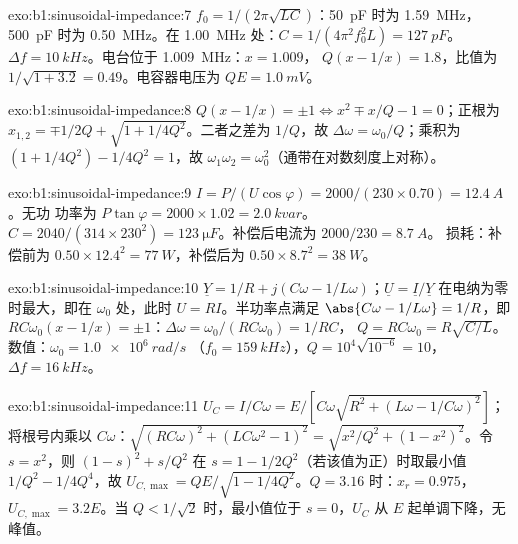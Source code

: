\begin{solution}{exo:b1:sinusoidal-impedance:7}
$f_0 = 1/(2\pi\sqrt{LC})$：\qty{50}{pF} 时为 \qty{1.59}{MHz}，\qty{500}{pF} 时为
\qty{0.50}{MHz}。在 \qty{1.00}{MHz} 处：$C = 1/(4\pi^2f_0^2L) = \qty{127}{pF}$。
$\Delta f = \qty{10}{kHz}$。电台位于 \qty{1.009}{MHz}：$x = 1.009$，
$Q(x - 1/x) = 1.8$，比值为 $1/\sqrt{1 + 3.2} = 0.49$。电容器电压为
$QE = \qty{1.0}{mV}$。
\end{solution}

\begin{solution}{exo:b1:sinusoidal-impedance:8}
$Q(x - 1/x) = \pm1 \Leftrightarrow x^2 \mp x/Q - 1 = 0$；正根为
$x_{1,2} = \mp 1/2Q + \sqrt{1 + 1/4Q^2}$。二者之差为 $1/Q$，故
$\Delta\omega = \omega_0/Q$；乘积为 $(1 + 1/4Q^2) - 1/4Q^2 = 1$，故
$\omega_1\omega_2 = \omega_0^2$（通带在对数刻度上对称）。
\end{solution}

\begin{solution}{exo:b1:sinusoidal-impedance:9}
$I = P/(U\cos\varphi) = 2000/(230 \times 0.70) = \qty{12.4}{A}$。无功
功率为 $P\tan\varphi = 2000 \times 1.02 = \qty{2.0}{kvar}$。$C = 2040/(314
\times 230^2) = \qty{123}{\micro F}$。补偿后电流为 $2000/230 = \qty{8.7}{A}$。
损耗：补偿前为 $0.50 \times 12.4^2 = \qty{77}{W}$，补偿后为 $0.50 \times 8.7^2 =
\qty{38}{W}$。
\end{solution}

\begin{solution}{exo:b1:sinusoidal-impedance:10}
$\underline Y = 1/R + j(C\omega - 1/L\omega)$；$\underline U = \underline I/
\underline Y$ 在电纳为零时最大，即在 $\omega_0$ 处，此时 $U = RI$。半功率点满足
$\abs{C\omega - 1/L\omega} = 1/R$，即
$RC\omega_0(x - 1/x) = \pm1$：$\Delta\omega = \omega_0/(RC\omega_0) = 1/RC$，
$Q = RC\omega_0 = R\sqrt{C/L}$。数值：$\omega_0 = \qty{1.0e6}{rad/s}$
（$f_0 = \qty{159}{kHz}$），$Q = 10^4\sqrt{10^{-6}} = 10$，$\Delta f =
\qty{16}{kHz}$。
\end{solution}

\begin{solution}{exo:b1:sinusoidal-impedance:11}
$U_C = I/C\omega = E/[C\omega\sqrt{R^2 + (L\omega - 1/C\omega)^2}]$；
将根号内乘以 $C\omega$：$\sqrt{(RC\omega)^2 + (LC\omega^2 - 1)^2} =
\sqrt{x^2/Q^2 + (1 - x^2)^2}$。令 $s = x^2$，则 $(1 - s)^2 + s/Q^2$ 在
$s = 1 - 1/2Q^2$（若该值为正）时取最小值 $1/Q^2 - 1/4Q^4$，故
$U_{C,\max} = QE/\sqrt{1 - 1/4Q^2}$。$Q = 3.16$ 时：$x_r = 0.975$，
$U_{C,\max} = 3.2E$。当 $Q < 1/\sqrt2$ 时，最小值位于 $s = 0$，$U_C$
从 $E$ 起单调下降，无峰值。
\end{solution}

